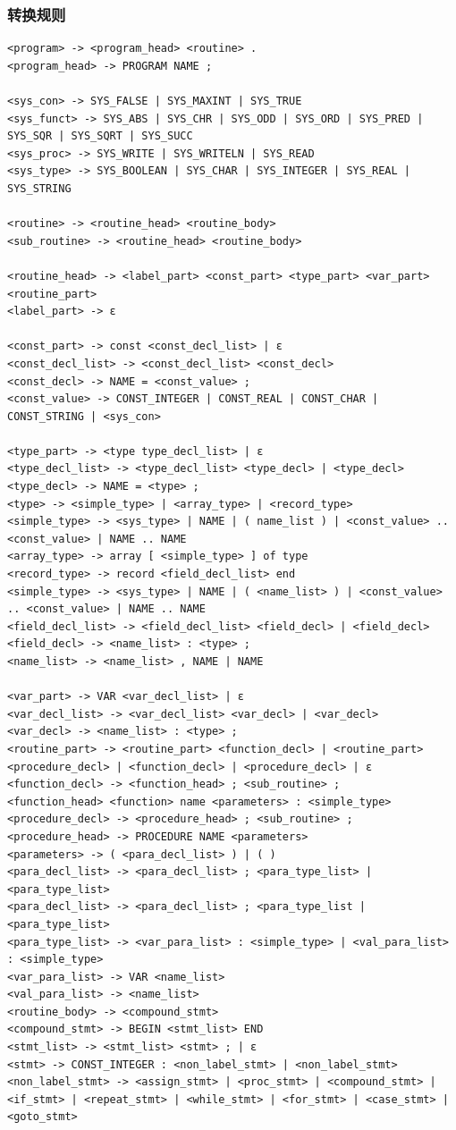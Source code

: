 \documentclass{article}
\begin{document}
\subsubsection{转换规则}
\begin{lstlisting}
<program> -> <program_head> <routine> .
<program_head> -> PROGRAM NAME ;

<sys_con> -> SYS_FALSE | SYS_MAXINT | SYS_TRUE
<sys_funct> -> SYS_ABS | SYS_CHR | SYS_ODD | SYS_ORD | SYS_PRED | SYS_SQR | SYS_SQRT | SYS_SUCC
<sys_proc> -> SYS_WRITE | SYS_WRITELN | SYS_READ
<sys_type> -> SYS_BOOLEAN | SYS_CHAR | SYS_INTEGER | SYS_REAL | SYS_STRING

<routine> -> <routine_head> <routine_body>
<sub_routine> -> <routine_head> <routine_body>

<routine_head> -> <label_part> <const_part> <type_part> <var_part> <routine_part>
<label_part> -> ε

<const_part> -> const <const_decl_list> | ε
<const_decl_list> -> <const_decl_list> <const_decl>
<const_decl> -> NAME = <const_value> ;
<const_value> -> CONST_INTEGER | CONST_REAL | CONST_CHAR | CONST_STRING | <sys_con>

<type_part> -> <type type_decl_list> | ε
<type_decl_list> -> <type_decl_list> <type_decl> | <type_decl>
<type_decl> -> NAME = <type> ;
<type> -> <simple_type> | <array_type> | <record_type>
<simple_type> -> <sys_type> | NAME | ( name_list ) | <const_value> .. <const_value> | NAME .. NAME
<array_type> -> array [ <simple_type> ] of type 
<record_type> -> record <field_decl_list> end
<simple_type> -> <sys_type> | NAME | ( <name_list> ) | <const_value> .. <const_value> | NAME .. NAME
<field_decl_list> -> <field_decl_list> <field_decl> | <field_decl>
<field_decl> -> <name_list> : <type> ;
<name_list> -> <name_list> , NAME | NAME

<var_part> -> VAR <var_decl_list> | ε
<var_decl_list> -> <var_decl_list> <var_decl> | <var_decl>
<var_decl> -> <name_list> : <type> ;
<routine_part> -> <routine_part> <function_decl> | <routine_part> <procedure_decl> | <function_decl> | <procedure_decl> | ε
<function_decl> -> <function_head> ; <sub_routine> ;
<function_head> <function> name <parameters> : <simple_type>
<procedure_decl> -> <procedure_head> ; <sub_routine> ;
<procedure_head> -> PROCEDURE NAME <parameters>
<parameters> -> ( <para_decl_list> ) | ( )
<para_decl_list> -> <para_decl_list> ; <para_type_list> | <para_type_list>
<para_decl_list> -> <para_decl_list> ; <para_type_list | <para_type_list>
<para_type_list> -> <var_para_list> : <simple_type> | <val_para_list> : <simple_type>
<var_para_list> -> VAR <name_list>
<val_para_list> -> <name_list>
<routine_body> -> <compound_stmt>
<compound_stmt> -> BEGIN <stmt_list> END
<stmt_list> -> <stmt_list> <stmt> ; | ε
<stmt> -> CONST_INTEGER : <non_label_stmt> | <non_label_stmt> 
<non_label_stmt> -> <assign_stmt> | <proc_stmt> | <compound_stmt> | <if_stmt> | <repeat_stmt> | <while_stmt> | <for_stmt> | <case_stmt> | <goto_stmt>


\end{lstlisting}
\end{document}
